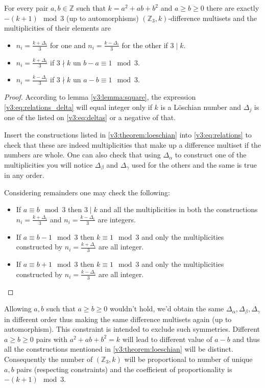 \begin{theorem}
    \label{v3:theorem:loeschian}
    For every pair $a,b \in \mathbb Z$ such that $k=a^2+ab+b^2$ and $a \geq b \geq 0$ there are exactly $-(k+1) \mod 3$ (up to automorphisms) $(\mathbb Z_3,k)$-difference multisets and the multiplicities of their elements are
    
    \begin{itemize}
        \item $n_i=\frac{k+\Delta_i}{3}$ for one and $n_i=\frac{k-\Delta_i}{3}$ for the other if $3 \mid k$.
        \item $n_i=\frac{k+\Delta_i}{3}$ if $3 \nmid k$ un $b-a \equiv 1 \mod 3$.
        \item $n_i=\frac{k-\Delta_i}{3}$ if $3 \nmid k$ un $a-b \equiv 1 \mod 3$.
    \end{itemize}
\end{theorem}

\begin{proof}
    According to lemma \ref{v3:lemma:square}, the expression \eqref{v3:eq:relations_delta} will equal integer only if $k$ is a Löschian number and $\Delta_j$ is one of the listed on \eqref{v3:eq:deltas} or a negative of that.
    
    Insert the constructions listed in \eqref{v3:theorem:loeschian} into \eqref{v3:eq:relations} to check that these are indeed multiplicities that make up a difference multiset if the numbers are whole. One can also check that using $\Delta_\alpha$ to construct one of the multiplicities you will notice $\Delta_\beta$ and $\Delta_\gamma$ used for the others and the same is true in any order.
    
    Considering remainders one may check the following:
    \begin{itemize}
        \item If $a \equiv b \mod 3$ then $3 \mid k$ and all the multiplicities in both the constructions $n_i=\frac{k+\Delta_i}{3}$ and $n_i=\frac{k-\Delta_i}{3}$ are integers.
        \item If $a \equiv b-1 \mod 3$ then $k \equiv 1 \mod 3$ and only the multiplicities constructed by $n_i=\frac{k+\Delta_i}{3}$ are all integer.
        \item If $a \equiv b+1 \mod 3$ then $k \equiv 1 \mod 3$ and only the multiplicities constructed by $n_i=\frac{k-\Delta_i}{3}$ are all integer.
    \end{itemize}
\end{proof}

\begin{remark}
    Allowing $a,b$ such that $a \geq b \geq 0$ wouldn't hold, we'd obtain the same $\Delta_\alpha, \Delta_\beta, \Delta_\gamma$ in different order thus making the same difference multisets again (up to automorphism). This constraint is intended to exclude such symmetries.
    Different $a \geq b \geq 0$ pairs with $a^2+ab+b^2=k$ will lead to different value of $a-b$ and thus all the constructions mentioned in \ref{v3:theorem:loeschian} will be distinct. Consequently the number of $(\mathbb Z_3,k)$ will be proportional to number of unique $a,b$ pairs (respecting constraints) and the coefficient of proportionality is $-(k+1) \mod 3$.
\end{remark}

